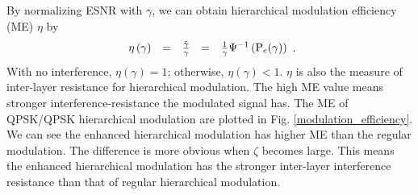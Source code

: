 \documentclass[conference]{IEEEtran}
\begin{document}
By normalizing ESNR with $\gamma$, we can obtain hierarchical
modulation efficiency (ME) $\eta$ by
\begin{equation}
\begin{array}{rcccl}
\eta\left(\gamma\right)&=&\frac{\tilde{\gamma}}{\gamma}&=&\frac{1}{\gamma}\Psi^{-1}\left({\rm
P}_{e}(\gamma)\right)
\end{array}.\label{mod_eff}
\end{equation}
\noindent With no interference, $\eta\left(\gamma\right)=1$;
otherwise, $\eta\left(\gamma\right)<1$. $\eta$ is also the measure
of inter-layer resistance for hierarchical modulation. The high ME
value means stronger interference-resistance the modulated signal
has. The ME of QPSK/QPSK hierarchical modulation are plotted in
Fig. \ref{modulation_efficiency}. We can see the enhanced
hierarchical modulation has higher ME than the regular modulation.
The difference is more obvious when $\zeta$ becomes large. This
means the enhanced hierarchical modulation has the stronger
inter-layer interference resistance than that of regular
hierarchical modulation.
\begin{figure}
\end{figure}
\end{document}

